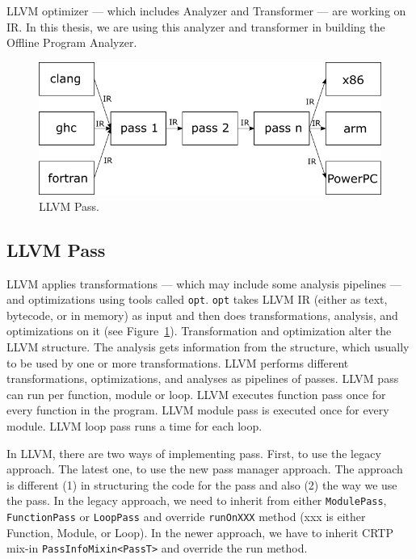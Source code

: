 LLVM optimizer --- which includes Analyzer and Transformer --- are working on
IR. In this thesis, we are using this analyzer and transformer in building the
Offline Program Analyzer.

\begin{figure}[ht] 
    \centerline{\includegraphics[scale=.75]{Figures/03/llvm-overview.png}} 
    \caption{LLVM Pass.} 
    \label{fig:llvm} 
\end{figure} 

\subsection{LLVM Pass}
\label{subsec:llvm-pass}

LLVM applies transformations --- which may include some analysis pipelines ---
and optimizations using tools called \texttt{opt}. \texttt{opt} takes LLVM IR
(either as text, bytecode, or in memory) as input and then does transformations,
analysis, and optimizations on it (see Figure~\ref{fig:llvm}). Transformation
and optimization alter the LLVM structure. The analysis gets information from
the structure, which usually to be used by one or more transformations. LLVM
performs different transformations, optimizations, and analyses as pipelines of
passes. LLVM pass can run per function, module or loop. LLVM executes function
pass once for every function in the program. LLVM module pass is executed once
for every module. LLVM loop pass runs a time for each loop.  


In LLVM, there are two ways of implementing pass. First, to use the legacy
approach. The latest one, to use the new pass manager approach. The approach is
different (1) in structuring the code for the pass and also (2) the way we use
the pass. In the legacy approach, we need to inherit from either
\texttt{ModulePass}, \texttt{FunctionPass} or \texttt{LoopPass} and override
\texttt{runOnXXX} method (xxx is either Function, Module, or Loop). In the newer
approach, we have to inherit CRTP mix-in \texttt{PassInfoMixin<PassT>} and
override the run method.

